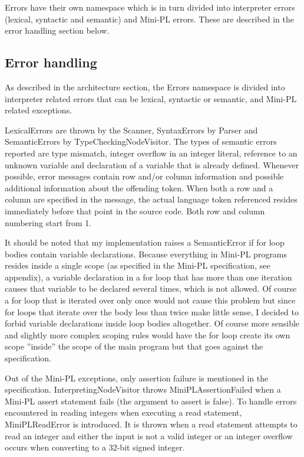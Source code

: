 \documentclass[a4paper,11pt]{article}
\begin{document}
Errors have their own namespace which is in turn divided into interpreter errors (lexical, syntactic and semantic) and Mini-PL errors. These are described in the error handling section below.

\subsection{Error handling}

As described in the architecture section, the Errors namespace is divided into interpreter related errors that can be lexical, syntactic or semantic, and Mini-PL related exceptions.

LexicalErrors are thrown by the Scanner, SyntaxErrors by Parser and SemanticErrors by TypeCheckingNodeVisitor. The types of semantic errors reported are type mismatch, integer overflow in an integer literal, reference to an unknown variable and declaration of a variable that is already defined. Whenever possible, error messages contain row and/or column information and possible additional information about the offending token. When both a row and a column are specified in the message, the actual language token referenced resides immediately before that point in the source code. Both row and column numbering start from 1.

It should be noted that my implementation raises a SemanticError if for loop bodies contain variable declarations. Because everything in Mini-PL programs resides inside a single scope (as specified in the Mini-PL specification, see appendix), a variable declaration in a for loop that has more than one iteration causes that variable to be declared several times, which is not allowed. Of course a for loop that is iterated over only once would not cause this problem but since for loops that iterate over the body less than twice make little sense, I decided to forbid variable declarations inside loop bodies altogether. Of course more sensible and slightly more complex scoping rules would have the for loop create its own scope ''inside'' the scope of the main program but that goes against the specification.

Out of the Mini-PL exceptions, only assertion failure is mentioned in the specification. InterpretingNodeVisitor throws MiniPLAssertionFailed when a Mini-PL assert statement fails (the argument to assert is false). To handle errors encountered in reading integers when executing a read statement, MiniPLReadError is introduced. It is thrown when a read statement attempts to read an integer and either the input is not a valid integer or an integer overflow occurs when converting to a 32-bit signed integer.
\end{document}
